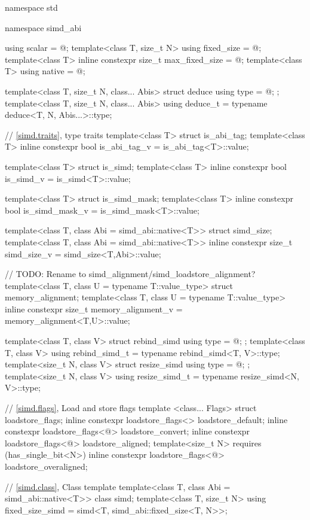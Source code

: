 \begin{codeblock}
namespace std {
  namespace simd_abi {
    using scalar = @\seebelow@;
    template<class T, size_t N> using fixed_size = @\seebelow@;
    template<class T> inline constexpr size_t max_fixed_size = @\impdef@;
    template<class T> using native = @\impdef@;

    template<class T, size_t N, class... Abis> struct deduce { using type = @\seebelow@; };
    template<class T, size_t N, class... Abis> using deduce_t =
      typename deduce<T, N, Abis...>::type;
  }

  // \ref{simd.traits},  type traits
  template<class T> struct is_abi_tag;
  template<class T> inline constexpr bool is_abi_tag_v = is_abi_tag<T>::value;

  template<class T> struct is_simd;
  template<class T> inline constexpr bool is_simd_v = is_simd<T>::value;

  template<class T> struct is_simd_mask;
  template<class T> inline constexpr bool is_simd_mask_v = is_simd_mask<T>::value;

  template<class T, class Abi = simd_abi::native<T>> struct simd_size;
  template<class T, class Abi = simd_abi::native<T>>
    inline constexpr size_t simd_size_v = simd_size<T,Abi>::value;

  // TODO: Rename to simd_alignment/simd_loadstore_alignment?
  template<class T, class U = typename T::value_type> struct memory_alignment;
  template<class T, class U = typename T::value_type>
    inline constexpr size_t memory_alignment_v = memory_alignment<T,U>::value;

  template<class T, class V> struct rebind_simd { using type = @\seebelow@; };
  template<class T, class V> using rebind_simd_t = typename rebind_simd<T, V>::type;
  template<size_t N, class V> struct resize_simd { using type = @\seebelow@; };
  template<size_t N, class V> using resize_simd_t = typename resize_simd<N, V>::type;

  // \ref{simd.flags}, Load and store flags
  template <class... Flags> struct loadstore_flags;
  inline constexpr loadstore_flags<> loadstore_default{};
  inline constexpr loadstore_flags<@\seebelow@> loadstore_convert{};
  inline constexpr loadstore_flags<@\seebelow@> loadstore_aligned{};
  template<size_t N> requires (has_single_bit<N>)
    inline constexpr loadstore_flags<@\seebelow@> loadstore_overaligned{};

  // \ref{simd.class}, Class template 
  template<class T, class Abi = simd_abi::native<T>> class simd;
  template<class T, size_t N> using fixed_size_simd = simd<T, simd_abi::fixed_size<T, N>>;

}
\end{codeblock}
